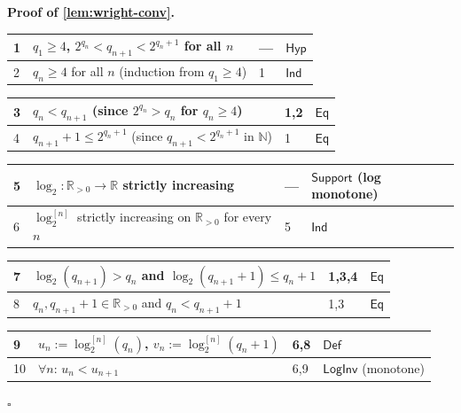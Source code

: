 \documentclass[11pt,reqno]{amsart}
\theoremstyle{blueplain}
\renewcommand{\qedsymbol}{\textcolor{proofqed}{\ensuremath{\square}}}
\renewenvironment{proof}[1][Proof]{\par\noindent\textbf{\textcolor{proofhead}{#1.}}\par\nobreak}{\par\nobreak\hfill\qedsymbol}
\numberwithin{equation}{section}
\begin{document}
\begin{proof}[\textbf{Proof of \cref{lem:wright-conv}}]
	\label{proof:lem:wright-conv}
	{\scriptsize
		\begin{tabular}{|m{0.7cm}|m{12cm}|m{1.4cm}|m{2.5cm}|}
			\hline
			1 & $q_1\ge 4$, $2^{q_n}<q_{n+1}<2^{q_n+1}$ for all $n$ & --- & $\mathsf{Hyp}$ \\ \hline
			2 & $q_n\ge 4$ for all $n$ (induction from $q_1\ge 4$) & 1 & $\mathsf{Ind}$ \\
		\end{tabular}%
		\noindent \newline
		\noindent
		\begin{tabular}{|m{0.7cm}|m{12cm}|m{1.4cm}|m{2.5cm}|}
			\hline
			3 & $q_n<q_{n+1}$ (since $2^{q_n}>q_n$ for $q_n\ge 4$) & 1,2 & $\mathsf{Eq}$ \\ \hline
			4 & $q_{n+1}+1\le 2^{q_n+1}$ (since $q_{n+1}<2^{q_n+1}$ in $\mathbb{N}$) & 1 & $\mathsf{Eq}$ \\
		\end{tabular}%
		\noindent \newline
		\noindent
		\begin{tabular}{|m{0.7cm}|m{12cm}|m{1.4cm}|m{2.5cm}|}
			\hline
			5 & $\log_2:\mathbb{R}_{>0}\to\mathbb{R}$ strictly increasing & --- & $\mathsf{Support}$ (log monotone) \\ \hline
			6 & $\log_2^{[n]}$ strictly increasing on $\mathbb{R}_{>0}$ for every $n$ & 5 & $\mathsf{Ind}$ \\
		\end{tabular}%
		\noindent \newline
		\noindent
		\begin{tabular}{|m{0.7cm}|m{12cm}|m{1.4cm}|m{2.5cm}|}
			\hline
			7 & $\log_2(q_{n+1})>q_n$ and $\log_2(q_{n+1}+1)\le q_n+1$ & 1,3,4 & $\mathsf{Eq}$ \\ \hline
			8 & $q_n,q_{n+1}+1\in\mathbb{R}_{>0}$ and $q_n<q_{n+1}+1$ & 1,3 & $\mathsf{Eq}$ \\
		\end{tabular}%
		\noindent \newline
		\noindent
		\begin{tabular}{|m{0.7cm}|m{12cm}|m{1.4cm}|m{2.5cm}|}
			\hline
			9 & $u_n:=\log_2^{[n]}(q_n)$, $v_n:=\log_2^{[n]}(q_n+1)$ & 6,8 & $\mathsf{Def}$ \\ \hline
			10 & $\forall n$: $u_n<u_{n+1}$ & 6,9 & $\mathsf{LogInv}$ (monotone) \\
		\end{tabular}%
		\noindent \newline
}
\end{proof}
\end{document}
